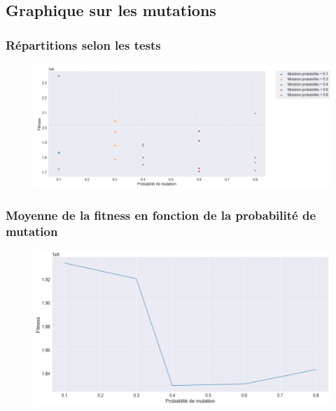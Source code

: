 \documentclass{article} %
\begin{document}
\newpage
\subsection{Graphique sur les mutations}
\subsubsection{Répartitions selon les tests}
\begin{figure}[!h]
	\centering
	\includegraphics[keepaspectratio = true,scale=0.65]{mutation_test.png}
\end{figure}
\subsubsection{Moyenne de la fitness en fonction de la probabilité de mutation}
\begin{figure}[!h]
	\centering
	\includegraphics[keepaspectratio = true,scale=0.65]{mutation_mean.png}
\end{figure}
\imtaMakeCover
\end{document}
